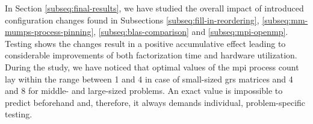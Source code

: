 



In Section \ref{subseq:final-results}, we have studied the overall impact of introduced configuration changes found in Subsections \ref{subseq:fill-in-reordering}, \ref{subseq:mm-mumps-process-pinning}, \ref{subseq:blas-comparison} and \ref{subseq:mpi-openmp}. Testing shows the changes result in a positive accumulative effect leading to considerable improvements of both factorization time and hardware utilization.\\



During the study, we have noticed that optimal values of the \acrshort{mpi} process count lay within the range between 1 and 4 in case of small-sized \acrshort{grs} matrices and 4 and 8 for middle- and large-sized problems. An exact value is impossible to predict beforehand and, therefore, it always demands individual, problem-specific testing.\\

